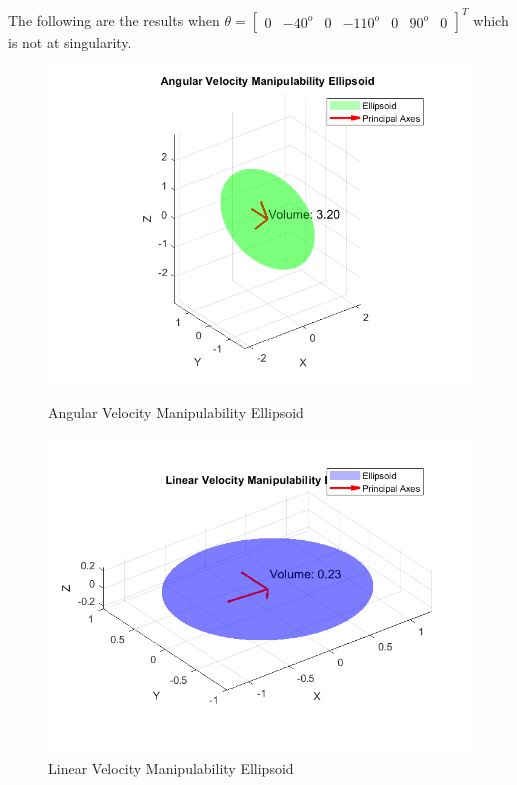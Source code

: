 \documentclass[english,10pt,a4paper]{article}
\begin{document}
    The following are the results when $\theta = \begin{bmatrix}
        0 & -40^o & 0 & -110^o & 0 & 90^o & 0
    \end{bmatrix}^T$ which is not at singularity.
    \begin{figure}[H]
        \centering
        \begin{minipage}{0.45\textwidth}
            \centering
            \includegraphics[width=\textwidth]{pga2a.png} %
            \caption{Angular Velocity Manipulability Ellipsoid}
            \label{fig:pga2a}
        \end{minipage}
        \hfill
        \begin{minipage}{0.45\textwidth}
        \centering
            \includegraphics[width=\textwidth]{pga2l.png} %
            \caption{Linear Velocity Manipulability Ellipsoid}
            \label{fig:pga2l}
        \end{minipage}
    \end{figure}
\end{document}
